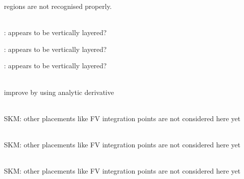 \begin{DoxyRefList}
\label{todo__todo000198}%
%
regions are not recognised properly.  
\item[Struct \doxylink{structcsmp_1_1_c_r_c3___rock_type8}{csmp\+::CRC3\+\_\+\+Rock\+Type8} ]\hfill \\
\label{todo__todo000089}%
%
\+: appears to be vertically layered? 

\label{todo__todo000268}%
%
\+: appears to be vertically layered? 

\label{todo__todo000271}%
%
\+: appears to be vertically layered?  
\item[Member \doxylink{classcsmp_1_1_cubic_spline_ac8e29683a48325ec630d48db9e8279c0}{csmp\+::Cubic\+Spline\+::Derivative} (const double x) const]\hfill \\
\label{todo__todo000054}%
%
improve by using analytic derivative  
\item[Member \doxylink{classcsmp_1_1_data_input_visitor_a7da6dd51acbcae9a3269173badeedf60}{csmp\+::Data\+Input\+Visitor\texorpdfstring{$<$}{<} Var, dim \texorpdfstring{$>$}{>}\+::Visit} (\doxylink{classcsmp_1_1_element}{Element$<$ dim $>$} \texorpdfstring{$\ast$}{*})]\hfill \\
\label{todo__todo000142}%
%
SKM\+: other placements like FV integration points are not considered here yet  
\item[Member \doxylink{classcsmp_1_1_data_input_visitor_a4b28735f85bdb5514a1cb16730a6585b}{csmp\+::Data\+Input\+Visitor\texorpdfstring{$<$}{<} Var, dim \texorpdfstring{$>$}{>}\+::Visit} (\doxylink{classcsmp_1_1_face}{Face$<$ dim $>$} \texorpdfstring{$\ast$}{*})]\hfill \\
\label{todo__todo000143}%
%
SKM\+: other placements like FV integration points are not considered here yet  
\item[Member \doxylink{classcsmp_1_1_data_input_visitor_a520c27b9869505dc9809dfb9e9ea49e2}{csmp\+::Data\+Input\+Visitor\texorpdfstring{$<$}{<} Var, dim \texorpdfstring{$>$}{>}\+::Visit} (\doxylink{classcsmp_1_1_inter_face}{Inter\+Face$<$ dim $>$} \texorpdfstring{$\ast$}{*})]\hfill \\
\label{todo__todo000144}%
%
SKM\+: other placements like FV integration points are not considered here yet  
\item[Member \doxylink{namespacecsmp_a697c13814bbca48781795127569b078a}{csmp\+::does\+Point\+Exist} (const map\texorpdfstring{$<$}{<} set$<$ size\+\_\+t $>$, \doxylink{classcsmp_1_1_grid_node}{Grid\+Node} \texorpdfstring{$\ast$}{*} \texorpdfstring{$>$}{>} \&additional\+\_\+points, \doxylink{classcsmp_1_1_grid_node}{Grid\+Node} \texorpdfstring{$\ast$}{*}\&pt, \doxylink{classcsmp_1_1_grid_node}{Grid\+Node} \texorpdfstring{$\ast$}{*}const pt0, \doxylink{classcsmp_1_1_grid_node}{Grid\+Node} \texorpdfstring{$\ast$}{*}const pt1, \doxylink{classcsmp_1_1_grid_node}{Grid\+Node} \texorpdfstring{$\ast$}{*}const pt2, \doxylink{classcsmp_1_1_grid_node}{Grid\+Node} \texorpdfstring{$\ast$}{*}const pt3)]\hfill \\

\end{DoxyRefList}
